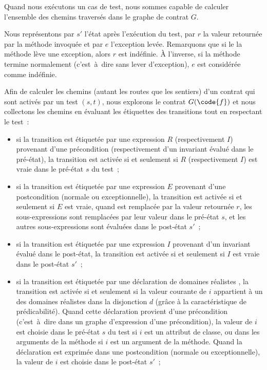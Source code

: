 Quand nous exécutons un cas de test, nous sommes capable de calculer l'ensemble
des chemins traversés dans le graphe de contrat $G$.

Nous représentons par $s'$ l'état après l'exécution du test, par $r$ la valeur
retournée par la méthode invoquée et par $e$ l'exception levée. Remarquons que
si le la méthode lève une exception, alors $r$ est indéfinie. À l'inverse, si la
méthode termine normalement (c'est~à~dire sans lever d'exception), $e$ est
considérée comme indéfinie.

Afin de calculer les chemins (autant les routes que les sentiers) d'un contrat
qui sont activés par un test $(s, t)$, nous explorons le contrat $G(\code{f})$
et nous collectons les chemins en évaluant les étiquettes des transitions tout
en respectant le test~:
%
\begin{itemize}

\item si la transition est étiquetée par une expression $R$ (respectivement
$I$) provenant d'une précondition (respectivement d'un invariant évalué dans le
pré-état), la transition est activée si et seulement si $R$ (respectivement $I$)
est vraie dans le pré-état $s$ du test~;

\item si la transition est étiquetée par une expression $E$ provenant d'une
postcondition (normale ou exceptionnelle), la transition est activée si et
seulement si $E$ est vraie, quand \aresult est remplacée par la valeur retournée
$r$, les sous-expressions \aold{\empty} sont remplacées par leur valeur dans le
pré-état $s$, et les autres sous-expressions sont évaluées dans le post-état
$s'$~;

\item si la transition est étiquetée par une expression $I$ provenant d'un
invariant évalué dans le post-état, la transition est activée si et seulement si
$I$ est vraie dans le post-état $s'$~;

\item si la transition est étiquetée par une déclaration de domaines réalistes
, la transition est activée si et seulement si la valeur courante
de $i$ appartient à un des domaines réalistes dans la disjonction $d$ (grâce à
la caractéristique de prédicabilité). Quand cette déclaration provient d'une
précondition (c'est~à~dire dans un graphe d'expression d'une précondition), la
valeur de $i$ est choisie dans le pré-état $s$ du test si $i$ est un attribut de
classe, ou dans les arguments de la méthode si $i$ est un argument de la
méthode. Quand la déclaration est exprimée dans une postcondition (normale ou
exceptionnelle), la valeur de $i$ est choisie dans le post-état $s'$~;


\end{itemize}
